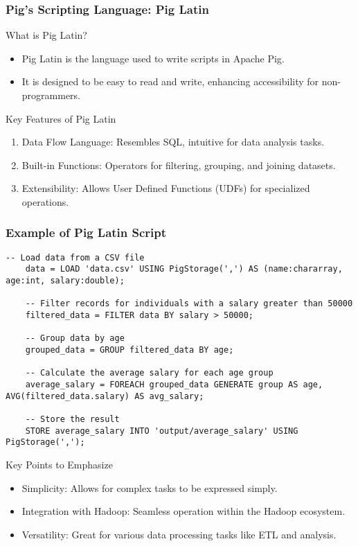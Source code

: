 \documentclass[aspectratio=169]{beamer}
\begin{document}
\begin{frame}[fragile]
    \frametitle{Pig's Scripting Language: Pig Latin}
    
    \begin{block}{What is Pig Latin?}
        \begin{itemize}
            \item Pig Latin is the language used to write scripts in Apache Pig.
            \item It is designed to be easy to read and write, enhancing accessibility for non-programmers.
        \end{itemize}
    \end{block}
    
    \begin{block}{Key Features of Pig Latin}
        \begin{enumerate}
            \item Data Flow Language: Resembles SQL, intuitive for data analysis tasks.
            \item Built-in Functions: Operators for filtering, grouping, and joining datasets.
            \item Extensibility: Allows User Defined Functions (UDFs) for specialized operations.
        \end{enumerate}
    \end{block}
\end{frame}

\begin{frame}[fragile]
    \frametitle{Example of Pig Latin Script}
    
    \begin{lstlisting}[language=Pig]
    -- Load data from a CSV file
    data = LOAD 'data.csv' USING PigStorage(',') AS (name:chararray, age:int, salary:double);
    
    -- Filter records for individuals with a salary greater than 50000
    filtered_data = FILTER data BY salary > 50000;
    
    -- Group data by age
    grouped_data = GROUP filtered_data BY age;
    
    -- Calculate the average salary for each age group
    average_salary = FOREACH grouped_data GENERATE group AS age, AVG(filtered_data.salary) AS avg_salary;
    
    -- Store the result
    STORE average_salary INTO 'output/average_salary' USING PigStorage(',');
    \end{lstlisting}
    
    \begin{block}{Key Points to Emphasize}
        \begin{itemize}
            \item Simplicity: Allows for complex tasks to be expressed simply.
            \item Integration with Hadoop: Seamless operation within the Hadoop ecosystem.
            \item Versatility: Great for various data processing tasks like ETL and analysis.
        \end{itemize}
    \end{block}
\end{frame}
\end{document}
